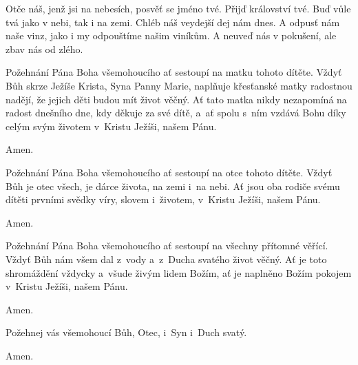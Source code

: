 \pars{}


\mbox{}

Otče náš, jenž jsi na nebesích,
posvěť se jméno tvé.
Přijď království tvé.
Buď vůle tvá jako v nebi, tak i na zemi.
Chléb náš veydejší dej nám dnes.
A odpusť nám naše vinz,
jako i my odpouštíme našim viníkům.
A neuveď nás v pokušení,
ale zbav nás od zlého.

\pars{}


 Požehnání Pána Boha všemohoucího ať sestoupí na matku tohoto dítěte.
Vždyť Bůh skrze Ježíše Krista, Syna Panny Marie, naplňuje křesťanské matky radostnou nadějí,
že jejich děti budou mít život věčný. Ať tato matka nikdy nezapomíná na radost dnešního dne,
kdy děkuje za své dítě, a~ať spolu s~ním vzdává Bohu díky celým svým životem v~Kristu Ježíši,
našem Pánu.

 Amen.

 Požehnání Pána Boha všemohoucího ať sestoupí na otce tohoto dítěte.
Vždyť Bůh je otec všech, je dárce života, na zemi i~na nebi.
Ať jsou oba rodiče svému dítěti prvními svědky víry, slovem i~životem, v~Kristu Ježíši, našem Pánu.

 Amen.

 Požehnání Pána Boha všemohoucího ať sestoupí na všechny přítomné věřící.
Vždyť Bůh nám všem dal z~vody a~z~Ducha svatého život věčný. Ať je toto shromáždění vždycky
a~všude živým lidem Božím, ať je naplněno Božím pokojem v~Kristu Ježíši, našem Pánu.

 Amen.

 Požehnej vás všemohoucí Bůh,
Otec, i~Syn \grecross{} i~Duch svatý.

 Amen.
